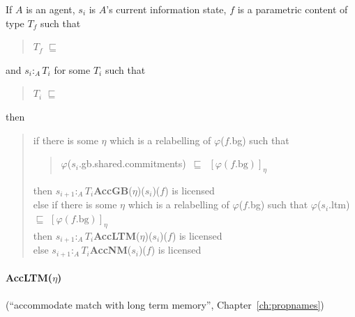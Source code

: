If $A$ is an agent, $s_i$ is $A$'s current information state, $f$ is a
parametric content of type $T_f$ such that
\begin{quote}
$T_f$ $\sqsubseteq$ 
\end{quote}
 and
$s_i:_A T_i$ for some $T_i$ such that 
\begin{quote}
$T_i$ $\sqsubseteq$ 
\end{quote}
then \\
\begin{quote}
if there is some $\eta$ which is a relabelling of $\varphi$($f$.bg) such that 
\begin{quote}
\mbox{$\varphi$($s_i$.gb.shared.commitments) $\sqsubseteq$ $[\varphi(f.\mathrm{bg})]_\eta$}
\end{quote}
then $s_{i+1} :_A
T_i$\fbox{\d{$\wedge$}}\textbf{AccGB}($\eta$)($s_i$)($f$) is
licensed\nopagebreak\\[\baselineskip]
else if there is some $\eta$ which is a relabelling of
$\varphi$($f$.bg) such that $\varphi$($s_i$.ltm)
$\sqsubseteq$ $[\varphi(f.\mathrm{bg})]_\eta$\nopagebreak\\[.25\baselineskip]
then $s_{i+1} :_A
T_i$\fbox{\d{$\wedge$}}\textbf{AccLTM}($\eta$)($s_i$)($f$) is
licensed\nopagebreak\\[\baselineskip] 
else $s_{i+1} :_A
T_i$\fbox{\d{$\wedge$}}\textbf{AccNM}($s_i$)($f$) is
licensed
\end{quote} 




\paragraph{\textbf{AccLTM}($\eta$)} (``accommodate match with long
term memory'', Chapter~\ref{ch:propnames})\nopagebreak

